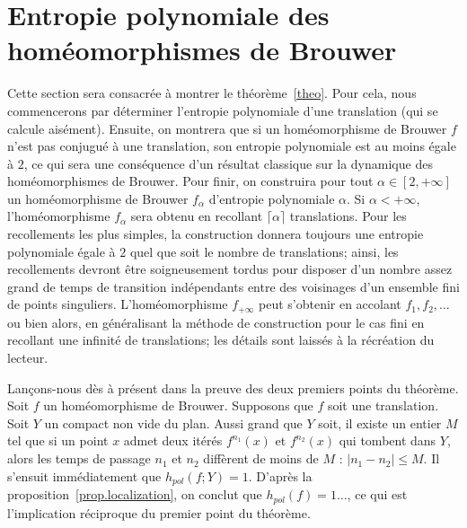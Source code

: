 \section{Entropie polynomiale des homéomorphismes de Brouwer}\label{s.brouwer}

Cette section sera consacrée à montrer le théorème~\ref{theo}. Pour cela, nous commencerons par déterminer l'entropie polynomiale d'une translation (qui se calcule aisément). Ensuite, on montrera que si un homéomorphisme de Brouwer $f$ n'est pas conjugué à une translation, son entropie polynomiale est {au moins égale à} $2$, {ce qui sera} une conséquence d'un résultat classique sur la dynamique des homéomorphismes de Brouwer. Pour finir, on construira pour tout $\alpha \in [2,+\infty]$ un homéomorphisme de Brouwer $f_\alpha$ d'entropie polynomiale $\alpha$. Si $\alpha< +\infty$, l'homéomorphisme $f_{\alpha}$ sera obtenu en \og recollant\fg{} $\lceil \alpha\rceil$ translations. Pour les recollements les plus simples, la construction donnera toujours une entropie polynomiale égale à $2$ quel que soit le nombre de translations; ainsi, les recollements devront être soigneusement \og tordus\fg{} pour disposer d'un nombre assez grand de temps de transition indépendants entre des voisinages d'un ensemble fini de points singuliers. L'homéomorphisme $f_{+\infty}$ peut s'obtenir en \og accolant\fg{} $f_1, f_2, \dots$ ou bien alors, en généralisant la méthode de construction pour le cas fini en recollant une infinité de translations; les détails sont laissés à la récréation du lecteur.


Lançons-nous dès à présent dans la preuve des deux premiers points du théorème. Soit $f$ un homéomorphisme de Brouwer. Supposons que $f$ soit une translation. Soit $Y$ un compact non vide du plan. Aussi grand que $Y$ soit, il existe un entier $M$ tel que si un point $x$ admet deux itérés $f^{n_1}(x)$ et $f^{n_2}(x)$ qui tombent dans $Y$, alors les temps de passage $n_1$ et $n_2$ diffèrent de moins de $M$ : $|n_1-n_2|\leq M$. Il s'ensuit immédiatement que $h_{pol}(f;Y) = 1$. D'après la proposition~\ref{prop.localization}, on conclut que $h_{pol}(f) = 1\dots$, ce qui est l'implication réciproque du premier point du théorème.

